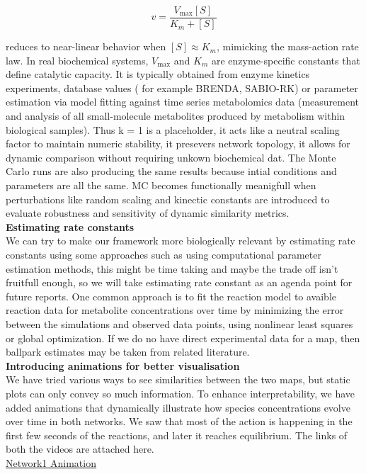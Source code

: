\documentclass[12pt,a4paper]{article}
\begin{document}
\[
v = \frac{V_{\text{max}} [S]}{K_m + [S]}
\]

reduces to near-linear behavior when \( [S] \approx K_m \), mimicking the mass-action rate law.
In real biochemical systems, \( V_{\text{max}} \) and \( K_m \) are enzyme-specific constants that define catalytic capacity. It is typically obtained from enzyme kinetics experiments, database values ( for example BRENDA, SABIO-RK) or parameter estimation via model fitting against time series metabolomics data (measurement and analysis of all small-molecule metabolites produced by metabolism within biological samples).
Thus k = 1 is a placeholder, it acts like a neutral scaling factor to maintain numeric stability, it presevers network topology, it allows for dynamic comparison without requiring unkown biochemical dat.
The Monte Carlo runs are also producing the same results because intial conditions and parameters are all the same. MC becomes functionally meanigfull when perturbations like random scaling and kinectic constants are introduced to evaluate robustness and sensitivity of dynamic similarity metrics.
\\
\textbf{Estimating rate constants} \\
We can try to make our framework more biologically relevant by estimating rate constants using some approaches such as using computational parameter estimation methods, this might be time taking and maybe the trade off isn't fruitfull enough, so we will take estimating rate constant as an agenda point for future reports.
One common approach is to fit the reaction model to avaible reaction data for metabolite concentrations over time by minimizing the error between the simulations and observed data points, using nonlinear least squares or global optimization. If we do no have direct experimental data for a map, then ballpark estimates may be taken from related literature.
\\
\textbf{Introducing animations for better visualisation} \\
We have tried various ways to see similarities between the two maps, but static plots can only convey so much information. To enhance interpretability, we have added animations that dynamically illustrate how species concentrations evolve over time in both networks. We saw that most of the action is happening in the first few seconds of the reactions, and later it reaches equilibrium. The links of both the videos are attached here.
\\
\href{https://www.youtube.com/watch?v=FTIlpC7isY0}{Network1 Animation} \\
\end{document}
